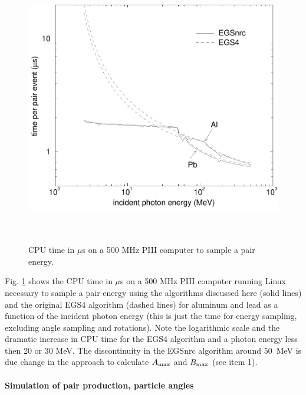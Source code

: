 \begin{figure}[h]
\includegraphics[height=12cm,width=12cm]{figures/pair_times}
\caption[CPU time for pair sampling]{\label{pair_times}
CPU time in $\mu$s on a 500 MHz PIII computer to sample a pair energy.}
\end{figure}

Fig. \ref{pair_times} shows the CPU time in $\mu$s on a 500 MHz PIII computer
running Linux necessary to sample a pair energy using the
algorithms discussed here (solid lines) and the original EGS4
algorithm (dashed lines) for aluminum and lead as a function
of the incident photon energy (this is just the time for
energy sampling, excluding angle sampling and rotations). Note
the logarithmic scale and the dramatic increase in CPU time for
the EGS4 algorithm and a photon energy less then 20 or 30 MeV.
The discontinuity in the EGSnrc algorithm around $50$~MeV
is due change in the
approach to calculate $A_{\rm max}$ and $B_{\rm max}$  (see item 1).

\paragraph{Simulation of pair production, particle angles}\hfill
{}

